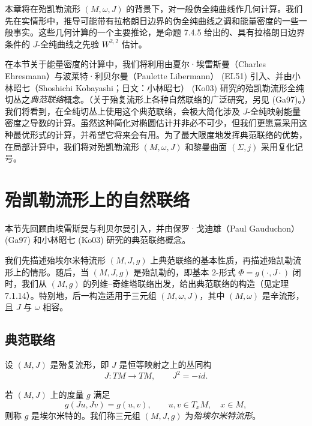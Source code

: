 本章将在殆凯勒流形 $(M,\omega,J)$ 的背景下，对一般伪全纯曲线作几何计算。我们先在实情形中，推导可能带有拉格朗日边界的伪全纯曲线之调和能量密度的一些一般事实。这些几何计算的一个主要推论，是命题 7.4.5 给出的、具有拉格朗日边界条件的 $J$-全纯曲线之先验 $W^{2,2}$ 估计。

在本节关于能量密度的计算中，我们将利用由夏尔·埃雷斯曼（Charles Ehresmann）与波莱特·利贝尔曼（Paulette Libermann） (EL51) 引入、并由小林昭七（Shoshichi Kobayashi；日文：小林昭七） (Ko03) 研究的殆凯勒流形全纯切丛之\emph{典范联络}概念。（关于殆复流形上各种自然联络的广泛研究，另见 (Ga97)。）我们将看到，在全纯切丛上使用这个典范联络，会极大简化涉及 $J$-全纯映射能量密度之导数的计算。虽然这种简化对椭圆估计并非必不可少，但我们更愿意采用这种最优形式的计算，并希望它将来会有用。为了最大限度地发挥典范联络的优势，在局部计算中，我们将对殆凯勒流形 $(M,\omega,J)$ 和黎曼曲面 $(\Sigma,j)$ 采用复化记号。

\section{殆凯勒流形上的自然联络}
\label{sec:natural-connection-almost-kahler}

本节先回顾由埃雷斯曼与利贝尔曼引入，并由保罗·戈迪雄（Paul Gauduchon） (Ga97) 和小林昭七 (Ko03) 研究的典范联络概念。

我们先描述殆埃尔米特流形 $(M,J,g)$ 上典范联络的基本性质，再描述殆凯勒流形上的情形。随后，当 $(M,J,g)$ 是殆凯勒的，即基本 $2$-形式 $\Phi=g(\cdot,J\cdot)$ 闭时，我们从 $(M,g)$ 的列维--奇维塔联络出发，给出典范联络的构造（见定理 7.1.14）。特别地，后一构造适用于三元组 $(M,\omega,J)$，其中 $(M,\omega)$ 是辛流形，且 $J$ 与 $\omega$ 相容。

\subsection{典范联络}
\label{subsec:canonical-connection}

设 $(M,J)$ 是殆复流形，即 $J$ 是恒等映射之上的丛同构
\[
 J:TM\longrightarrow TM,
 \qquad J^2=-id.
\]

\begin{definition}\label{def:hermitian-metric-almost-complex}
若 $(M,J)$ 上的度量 $g$ 满足
\[
 g(Ju,Jv)=g(u,v),\qquad u,v\in T_xM,\quad x\in M,
\]
则称 $g$ 是埃尔米特的。我们称三元组 $(M,J,g)$ 为\emph{殆埃尔米特流形}。
\end{definition}

